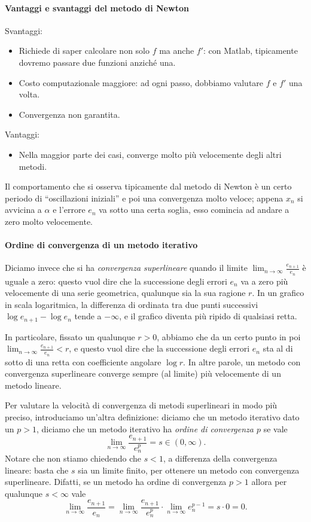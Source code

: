 \documentclass[a4paper]{report}
\theoremstyle{definiton}
\theoremstyle{remark}
\begin{document}
\paragraph{Vantaggi e svantaggi del metodo di Newton}
Svantaggi:
\begin{itemize}
    \item Richiede di saper calcolare non solo $f$ ma anche $f'$: con Matlab, tipicamente dovremo passare due funzioni anziché una.
    \item Costo computazionale maggiore: ad ogni passo, dobbiamo valutare $f$ e $f'$ una volta.
    \item Convergenza non garantita.
\end{itemize}
Vantaggi:
\begin{itemize}
    \item Nella maggior parte dei casi, converge molto più velocemente degli altri metodi.
\end{itemize}

Il comportamento che si osserva tipicamente dal metodo di Newton è un certo periodo di ``oscillazioni iniziali'' e poi una convergenza molto veloce; appena $x_n$ si avvicina a $\alpha$ e l'errore $e_n$ va sotto una certa soglia, esso comincia ad andare a zero molto velocemente.

\paragraph{Ordine di convergenza di un metodo iterativo}

Diciamo invece che si ha \emph{convergenza superlineare} quando il limite $\lim_{n \to \infty }\frac{e_{n+1}}{e_n}$ è uguale a zero: questo vuol dire che la successione degli errori $e_n$ va a zero più velocemente di una serie geometrica, qualunque sia la sua ragione $r$. In un grafico in scala logaritmica, la differenza di ordinata tra due punti successivi $\log e_{n+1} - \log e_n$ tende a $-\infty$, e il grafico diventa più ripido di qualsiasi retta.

In particolare, fissato un qualunque $r>0$, abbiamo che da un certo punto in poi $\lim_{n \to \infty }\frac{e_{n+1}}{e_n} < r$, e  questo vuol dire che la successione degli errori $e_n$ sta al di sotto di una retta con coefficiente angolare $\log r$. In altre parole, un metodo con convergenza superlineare converge sempre (al limite) più velocemente di un metodo lineare.

Per valutare la velocità di convergenza di metodi superlineari in modo più preciso, introduciamo un'altra definizione: diciamo che un metodo iterativo dato un $p > 1$, diciamo che un metodo iterativo ha \emph{ordine di convergenza $p$} se vale
\[
\lim_{n \to \infty }\frac{e_{n+1}}{e_n^p} = s \in (0,\infty).
\]
Notare che non stiamo chiedendo che $s<1$, a differenza della convergenza lineare: basta che $s$ sia un limite finito, per ottenere un metodo con convergenza superlineare. Difatti, se un metodo ha ordine di convergenza $p>1$ allora per qualunque $s<\infty$ vale
\begin{equation} \label{almeno}
\lim_{n \to \infty }\frac{e_{n+1}}{e_n} = \lim_{n \to \infty }\frac{e_{n+1}}{e_n^p} \cdot \lim_{n \to \infty } e_n^{p-1} = s \cdot 0 = 0.
\end{equation}
\end{document}
